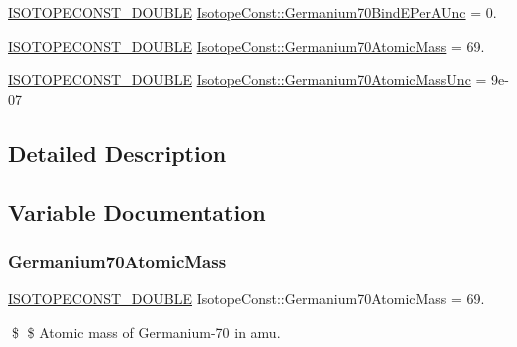 \begin{DoxyCompactItemize}
\mbox{\hyperlink{group___isotope_const-_macros_ga8f45a7272ce02c0b4c65c44636ed719a}{I\+S\+O\+T\+O\+P\+E\+C\+O\+N\+S\+T\+\_\+\+D\+O\+U\+B\+LE}} \mbox{\hyperlink{group___isotope_const-_germanium-_ge70_ga39fe37b03a8ffbea3271f386eff81bc0}{Isotope\+Const\+::\+Germanium70\+Bind\+E\+Per\+A\+Unc}} = 0.
\item 
\mbox{\hyperlink{group___isotope_const-_macros_ga8f45a7272ce02c0b4c65c44636ed719a}{I\+S\+O\+T\+O\+P\+E\+C\+O\+N\+S\+T\+\_\+\+D\+O\+U\+B\+LE}} \mbox{\hyperlink{group___isotope_const-_germanium-_ge70_ga90bcaba5d6240685bbe8003c16ed17fd}{Isotope\+Const\+::\+Germanium70\+Atomic\+Mass}} = 69.
\item 
\mbox{\hyperlink{group___isotope_const-_macros_ga8f45a7272ce02c0b4c65c44636ed719a}{I\+S\+O\+T\+O\+P\+E\+C\+O\+N\+S\+T\+\_\+\+D\+O\+U\+B\+LE}} \mbox{\hyperlink{group___isotope_const-_germanium-_ge70_gaaecce9f990e873fb192da423d52b7185}{Isotope\+Const\+::\+Germanium70\+Atomic\+Mass\+Unc}} = 9e-\/07
\end{DoxyCompactItemize}


\subsection{Detailed Description}


\subsection{Variable Documentation}
\mbox{\label{group___isotope_const-_germanium-_ge70_ga90bcaba5d6240685bbe8003c16ed17fd}} 
\subsubsection{\texorpdfstring{Germanium70\+Atomic\+Mass}{Germanium70AtomicMass}}
{\footnotesize\ttfamily \mbox{\hyperlink{group___isotope_const-_macros_ga8f45a7272ce02c0b4c65c44636ed719a}{I\+S\+O\+T\+O\+P\+E\+C\+O\+N\+S\+T\+\_\+\+D\+O\+U\+B\+LE}} Isotope\+Const\+::\+Germanium70\+Atomic\+Mass = 69.}

\$ \$ Atomic mass of Germanium-\/70 in amu. \mbox{\label{group___isotope_const-_germanium-_ge70_gaaecce9f990e873fb192da423d52b7185}} 

